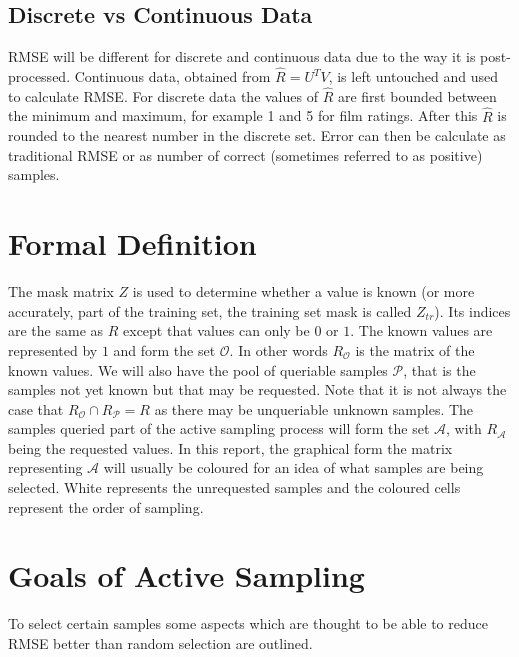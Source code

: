 \subsection{Discrete vs Continuous Data}
RMSE will be different for discrete and continuous data due to the way it is post-processed. Continuous data, obtained from $\hat{R}=U^TV$, is left untouched and used to calculate RMSE. For discrete data the values of $\hat{R}$ are first bounded between the minimum and maximum, for example 1 and 5 for film ratings. After this $\hat{R}$ is rounded to the nearest number in the discrete set. Error can then be calculate as traditional RMSE or as number of correct (sometimes referred to as positive) samples\cite{recsyshand}.

\section{Formal Definition}
The mask matrix $Z$ is used to determine whether a value is known (or more accurately, part of the training set, the training set mask is called $Z_{tr}$). Its indices are the same as $R$ except that values can only be $0$ or $1$. The known values are represented by $1$ and form the set $\mathcal{O}$. In other words $R_\mathcal{O}$ is the matrix of the known values. We will also have the pool of queriable samples $\mathcal{P}$, that is the samples not yet known but that may be requested. Note that it is not always the case that $R_{\mathcal{O}} \cap R_{\mathcal{P}} = R$ as there may be unqueriable unknown samples. The samples queried part of the active sampling process will form the set $\mathcal{A}$, with $R_{\mathcal{A}}$ being the requested values. In this report, the graphical form the matrix representing $\mathcal{A}$ will usually be coloured for an idea of what samples are being selected. White represents the unrequested samples and the coloured cells represent the order of sampling.


\section{Goals of Active Sampling}
\label{sec:as_goals}
To select certain samples some aspects which are thought to be able to reduce RMSE better than random selection are outlined.

